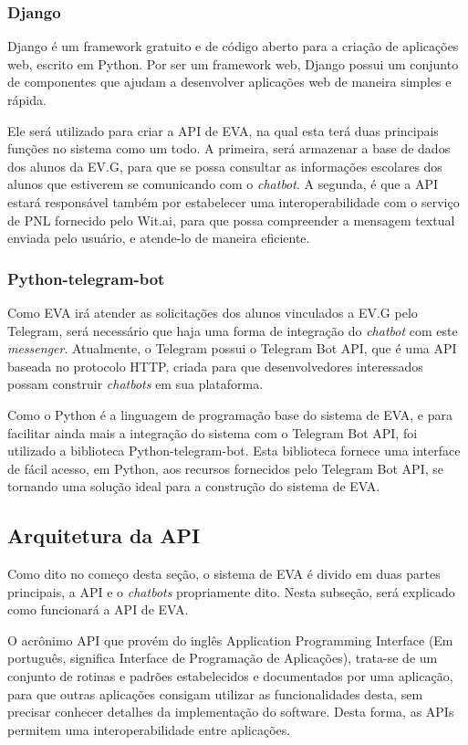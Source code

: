 \subsubsection{Django}

Django é um framework gratuito e de código aberto para a criação de aplicações web, escrito em Python. Por ser um framework web, Django possui um conjunto de componentes que ajudam a desenvolver aplicações web de maneira simples e rápida.

Ele será utilizado para criar a API de EVA, na qual esta terá duas principais funções no sistema como um todo. A primeira, será armazenar a base de dados dos alunos da EV.G, para que se possa consultar as informações escolares dos alunos que estiverem se comunicando com o \textit{chatbot}. A segunda, é que a API estará responsável também por estabelecer uma interoperabilidade com o serviço de PNL fornecido pelo Wit.ai, para que possa compreender a mensagem textual enviada pelo usuário, e atende-lo de maneira eficiente.

\subsubsection{Python-telegram-bot}

Como EVA irá atender as solicitações dos alunos vinculados a EV.G pelo Telegram, será necessário que haja uma forma de integração do \textit{chatbot} com este \textit{messenger}. Atualmente, o Telegram possui o Telegram Bot API, que é uma API baseada no protocolo HTTP, criada para que desenvolvedores interessados possam construir \textit{chatbots} em sua plataforma.

Como o Python é a linguagem de programação base do sistema de EVA, e para facilitar ainda mais a integração do sistema com o Telegram Bot API, foi utilizado a biblioteca Python-telegram-bot. Esta biblioteca fornece uma interface de fácil acesso, em Python, aos recursos fornecidos pelo Telegram Bot API, se tornando uma solução ideal para a construção do sistema de EVA.

\subsection{Arquitetura da API}

Como dito no começo desta seção, o sistema de EVA é divido em duas partes principais, a API e o \textit{chatbots} propriamente dito. Nesta subseção, será explicado como funcionará a API de EVA.

O acrônimo API que provém do inglês Application Programming Interface (Em português, significa Interface de Programação de Aplicações), trata-se de um conjunto de rotinas e padrões estabelecidos e documentados por uma aplicação, para que outras aplicações consigam utilizar as funcionalidades desta, sem precisar conhecer detalhes da implementação do software. Desta forma, as APIs permitem uma interoperabilidade entre aplicações.

